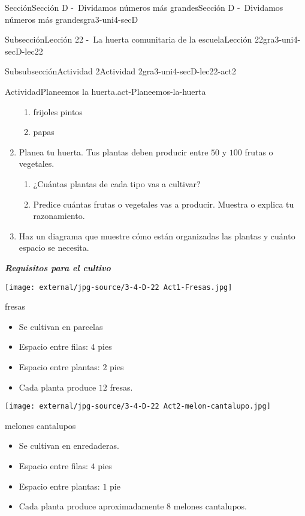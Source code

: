 \documentclass[twoside,14pt,]{extarticle}
\newcommand{\alert}[1]{\textbf{\textit{#1}}}
\begin{document}
\begin{sectionptx}{Sección}{Sección D -~Dividamos números más grandes}{}{Sección D -~Dividamos números más grandes}{}{}{gra3-uni4-secD}
\begin{subsectionptx}{Subsección}{Lección 22 -~La huerta comunitaria de la escuela}{}{Lección 22}{}{}{gra3-uni4-secD-lec22}
\begin{subsubsectionptx}{Subsubsección}{Actividad 2}{}{Actividad 2}{}{}{gra3-uni4-secD-lec22-act2}
\begin{activity}{Actividad}{Planeemos la huerta.}{act-Planeemos-la-huerta}
\begin{enumerate}
\begin{enumerate}
\item{}frijoles pintos%
\item{}papas%
\end{enumerate}
\item{}Planea tu huerta. Tus plantas deben producir entre \(50\) y \(100\) frutas o vegetales.%
%
\begin{enumerate}
\item{}¿Cuántas plantas de cada tipo vas a cultivar?%
\item{}Predice cuántas frutas o vegetales vas a producir. Muestra o explica tu razonamiento.%
\end{enumerate}
\item{}Haz un diagrama que muestre cómo están organizadas las plantas y cuánto espacio se necesita.%
\end{enumerate}
\alert{Requisitos para el cultivo}%
\begin{sidebyside}{2}{0}{0}{0}%
\begin{sbspanel}{0.5}%
\texttt{[image: external/jpg-source/3-4-D-22 Act1-Fresas.jpg]}
%
\par
fresas%
%
\begin{itemize}[label=\textbullet]
\item{}Se cultivan en parcelas%
\item{}Espacio entre filas: \(4\) pies%
\item{}Espacio entre plantas: \(2\) pies%
\item{}Cada planta produce \(12\) fresas.%
\end{itemize}
\end{sbspanel}%
\begin{sbspanel}{0.5}%
\texttt{[image: external/jpg-source/3-4-D-22 Act2-melon-cantalupo.jpg]}
%
\par
melones cantalupos%
%
\begin{itemize}[label=\textbullet]
\item{}Se cultivan en enredaderas.%
\item{}Espacio entre filas: \(4\) pies%
\item{}Espacio entre plantas: \(1\) pie%
\item{}Cada planta produce aproximadamente \(8\) melones cantalupos.%
\end{itemize}
\end{sbspanel}%
\end{sidebyside}%
\begin{sidebyside}{2}{0}{0}{0}%
\begin{sbspanel}{0.5}%

\end{sbspanel}
\end{sidebyside}
\end{activity}
\end{subsubsectionptx}
\end{subsectionptx}
\end{sectionptx}
\end{document}
